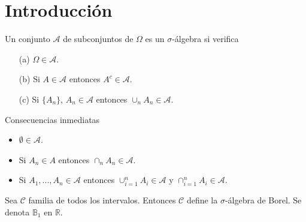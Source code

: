 \chapter{Introducción}

\begin{defi}
    Un conjunto $\mathcal{A}$ de subconjuntos de $\Omega$ es un $\sigma$-álgebra si verifica
    \begin{enumerate}
        \item[(a)] $\Omega \in \mathcal{A}$.
        \item[(b)] Si $A \in \mathcal{A}$ entonces $A^c \in \mathcal{A}$.
        \item[(c)] Si $\{A_n\}$, $A_n \in \mathcal{A}$ entonces $\cup_{n}{A_n} \in \mathcal{A}$.
    \end{enumerate}
    Consecuencias inmediatas
    \begin{itemize}
        \item $\emptyset \in \mathcal{A}$.
        \item Si $A_n \in A$ entonces $\cap_{n}{A_n} \in \mathcal{A}$.
        \item Si $A_1,...,A_n \in \mathcal{A}$ entonces $\cup_{i=1}^{n}{A_i} \in \mathcal{A}$ y $\cap_{i=1}^{n}{A_i} \in \mathcal{A}$.
    \end{itemize}
\end{defi}

\begin{defi}
    Sea $\mathcal{C}$ familia de todos los intervalos. Entonces $\mathcal{C}$ define la $\sigma$-álgebra de Borel. Se denota $\mathbb{B}_1$ en $\mathbb{R}$.
\end{defi}

